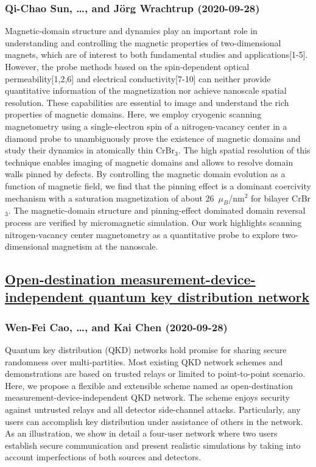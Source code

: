 \subsubsection*{Qi-Chao Sun, \dots, and Jörg Wrachtrup (2020-09-28)}
Magnetic-domain structure and dynamics play an important role in
understanding and controlling the magnetic properties of two-dimensional
magnets, which are of interest to both fundamental studies and
applications[1-5]. However, the probe methods based on the spin-dependent
optical permeability[1,2,6] and electrical conductivity[7-10] can neither
provide quantitative information of the magnetization nor achieve nanoscale
spatial resolution. These capabilities are essential to image and understand
the rich properties of magnetic domains. Here, we employ cryogenic scanning
magnetometry using a single-electron spin of a nitrogen-vacancy center in a
diamond probe to unambiguously prove the existence of magnetic domains and
study their dynamics in atomically thin CrBr$_3$. The high spatial resolution
of this technique enables imaging of magnetic domains and allows to resolve
domain walls pinned by defects. By controlling the magnetic domain evolution as
a function of magnetic field, we find that the pinning effect is a dominant
coercivity mechanism with a saturation magnetization of about 26~$\mu_B$/nm$^2$
for bilayer CrBr$_3$. The magnetic-domain structure and pinning-effect
dominated domain reversal process are verified by micromagnetic simulation. Our
work highlights scanning nitrogen-vacancy center magnetometry as a quantitative
probe to explore two-dimensional magnetism at the nanoscale.

\subsection*{\href{http://arxiv.org/abs/2009.13439v2}{Open-destination measurement-device-independent quantum key distribution  network}}
\subsubsection*{Wen-Fei Cao, \dots, and Kai Chen (2020-09-28)}
Quantum key distribution (QKD) networks hold promise for sharing secure
randomness over multi-partities. Most existing QKD network schemes and
demonstrations are based on trusted relays or limited to point-to-point
scenario. Here, we propose a flexible and extensible scheme named as
open-destination measurement-device-independent QKD network. The scheme enjoys
security against untrusted relays and all detector side-channel attacks.
Particularly, any users can accomplish key distribution under assistance of
others in the network. As an illustration, we show in detail a four-user
network where two users establish secure communication and present realistic
simulations by taking into account imperfections of both sources and detectors.

